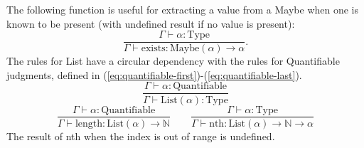 \documentclass[11pt]{article}
\begin{document}
The following function is useful for extracting a value from a Maybe when one is known to be present
(with undefined result if no value is present):
\begin{equation}
	\frac{\Gamma \vdash \alpha : \text{Type}}
	{\Gamma \vdash \text{exists} : \text{Maybe}(\alpha) \to \alpha}.
\end{equation}
The rules for List have a circular dependency with the rules for
Quantifiable judgments, defined in (\ref{eq:quantifiable-first})-(\ref{eq:quantifiable-last}).
\begin{equation}
	\frac{\Gamma \vdash \alpha : \text{Quantifiable}}
	{\Gamma \vdash \text{List}(\alpha) : \text{Type}}
\end{equation}
\begin{equation}
	\frac{\Gamma \vdash \alpha : \text{Quantifiable}}
	{\Gamma \vdash \text{length} : \text{List}(\alpha) \to \mathbb{N}}
	\qquad
	\frac{\Gamma \vdash \alpha : \text{Type}}
	{\Gamma \vdash \text{nth} : \text{List}(\alpha) \to \mathbb{N} \to \alpha}
\end{equation}
The result of nth when the index is out of range is undefined.
\end{document}
